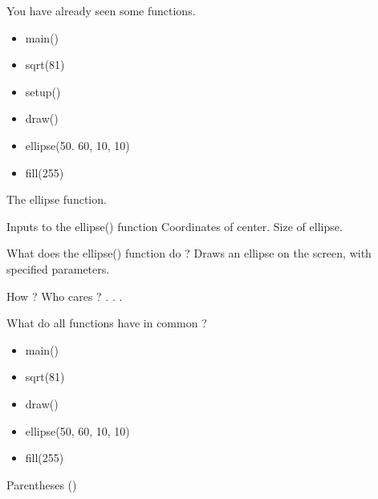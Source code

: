 \begin{frame}[fragile]{You have already seen some functions.}{}
    \begin{itemize}
        \item main()
        \item sqrt(81)
        \item setup()
        \item draw()
        \item ellipse(50. 60, 10, 10)
        \item fill(255)
    \end{itemize}
\end{frame}

\begin{frame}[fragile]{The ellipse function.}{}
    \LARGE
    \begin{block}{Inputs to the ellipse() function}
        Coordinates of center. Size of ellipse.
    \end{block}
        \pause
    \begin{block}{What does the ellipse() function do ?}
        \pause
        Draws an ellipse on the screen, with specified parameters.
    \end{block}
        \pause
    \begin{block}{How ?}
        \pause
        Who cares ? . . .
    \end{block}
\end{frame}

\begin{frame}[fragile]{What do all functions have in common ?}{}
    \begin{itemize}
        \item main()
        \item sqrt(81)
        \item draw()
        \item ellipse(50, 60, 10, 10)
        \item fill(255)
    \end{itemize}
    \vfill
    \Huge Parentheses ()
\end{frame}


